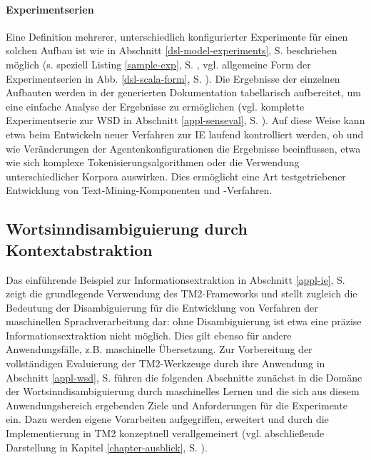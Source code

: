 \documentclass[abstracton, 12pt]{scrartcl}
\begin{document}
\paragraph{Experimentserien} \label{tdd}

Eine Definition mehrerer, unterschiedlich konfigurierter Experimente für einen solchen Aufbau ist wie in Abschnitt \ref{dsl-model-experiments}, S. \pageref{dsl-model-experiments} beschrieben möglich (s. speziell Listing \ref{sample-exp}, S. \pageref{sample-exp}, vgl. allgemeine Form der Experimentserien in Abb. \ref{dsl-scala-form}, S. \pageref{dsl-scala-form}). Die Ergebnisse der einzelnen Aufbauten werden in der generierten Dokumentation tabellarisch aufbereitet, um eine einfache Analyse der Ergebnisse zu ermöglichen (vgl. komplette Experimentserie zur WSD in Abschnitt \ref{appl-senseval}, S. \pageref{appl-senseval}). Auf diese Weise kann etwa beim Entwickeln neuer Verfahren zur IE laufend kontrolliert werden, ob und wie Veränderungen der Agentenkonfigurationen die Ergebnisse beeinflussen, etwa wie sich komplexe Tokenisierungsalgorithmen oder die Verwendung unterschiedlicher Korpora auswirken. Dies ermöglicht eine Art testgetriebener Entwicklung \citep{Beck2003} von Text-Mining-Komponenten und -Verfahren.

\subsection{Wortsinndisambiguierung durch Kontextabstraktion} \label{chapter-wsd-ml}

Das einführende Beispiel zur Informationsextraktion in Abschnitt \ref{appl-ie}, S. \pageref{appl-ie} zeigt die grundlegende Verwendung des TM2-Frameworks und stellt zugleich die Bedeutung der Disambiguierung für die Entwicklung von Verfahren der maschinellen Sprachverarbeitung dar: ohne Disambiguierung ist etwa eine präzise Informationsextraktion nicht möglich. Dies gilt ebenso für andere Anwendungsfälle, z.B. maschinelle Übersetzung. Zur Vorbereitung der vollständigen Evaluierung der TM2-Werkzeuge durch ihre Anwendung in Abschnitt \ref{appl-wsd}, S. \pageref{appl-wsd} führen die folgenden Abschnitte zunächst in die Domäne der Wortsinndisambiguierung durch maschinelles Lernen und die sich aus diesem Anwendungsbereich ergebenden Ziele und Anforderungen für die Experimente ein. Dazu werden eigene Vorarbeiten \citep{Steeg2007} aufgegriffen, erweitert und durch die Implementierung in TM2 konzeptuell verallgemeinert (vgl. abschließende Darstellung in Kapitel \ref{chapter-ausblick}, S. \pageref{chapter-ausblick}).
\end{document}

